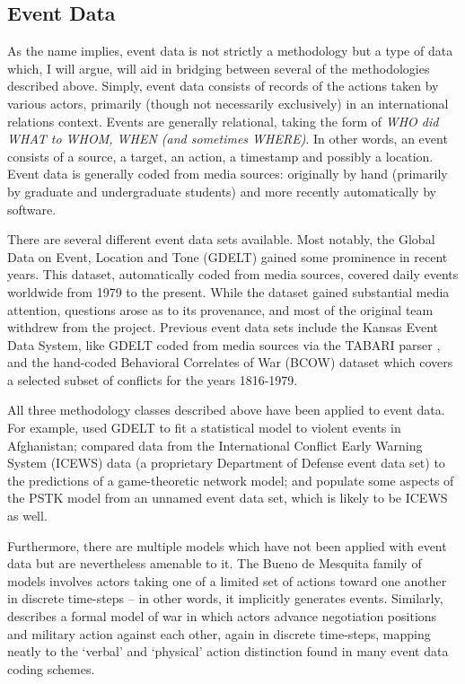 \subsection{Event Data}\label{event-data}

As the name implies, event data is not strictly a methodology but a type of data which, I will argue, will aid in bridging between several of the methodologies described above. Simply, event data consists of records of the actions taken by various actors, primarily (though not necessarily exclusively) in an international relations context. Events are generally relational, taking the form of \emph{WHO did WHAT to WHOM, WHEN (and sometimes WHERE)}. In other words, an event consists of a source, a target, an action, a timestamp and possibly a location. Event data is generally coded from media sources: originally by hand (primarily by graduate and undergraduate students) and more recently automatically by software.

There are several different event data sets available. Most notably,  the Global Data on Event, Location and Tone (GDELT) \citep{leetaru_2013} gained some prominence in recent years. This dataset, automatically coded from media sources, covered daily events worldwide from 1979 to the present. While the dataset gained substantial media attention, questions arose as to its provenance, and most of the original team withdrew from the project. Previous event data sets include the Kansas Event Data System\citep{schrodt_2006}, like GDELT coded from media sources via the TABARI parser \citep{schrodt_2001a}, and the hand-coded Behavioral Correlates of War (BCOW) dataset \citep{leng_1987} which covers a selected subset of conflicts for the years 1816-1979.

All three methodology classes described above have been applied to event data. For example, \citet{yonamine_2013} used GDELT to fit a statistical model to violent events in Afghanistan; \citet{metternich_2013} compared data from the International Conflict Early Warning System (ICEWS) data (a proprietary Department of Defense event data set) to the predictions of a game-theoretic network model; and \citet{taylor_2009} populate some aspects of the PSTK model from an unnamed event data set, which is likely to be ICEWS as well.

Furthermore, there are multiple models which have not been applied with event data but are nevertheless amenable to it. The Bueno de Mesquita family of models involves actors taking one of a limited set of actions toward one another in discrete time-steps -- in other words, it implicitly generates events. Similarly, \citet{slantchev_2003} describes a formal model of war in which actors advance negotiation positions and military action against each other, again in discrete time-steps, mapping neatly to the `verbal' and `physical' action distinction found in many event data coding schemes.

